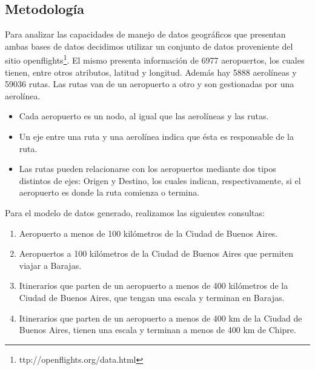 \documentclass{llncs}
\begin{document}
\subsection{Metodología}
Para analizar las capacidades de manejo de datos geográficos que presentan ambas bases de datos decidimos utilizar un conjunto de datos proveniente del sitio openflights\footnote{ttp://openflights.org/data.html}. El mismo presenta información de 6977 aeropuertos, los cuales tienen, entre otros atributos, latitud y longitud. Además hay 5888 aerolíneas y 59036 rutas. Las rutas van de un aeropuerto a otro y son gestionadas por una aerolínea.

\begin{itemize}
\item Cada aeropuerto es un nodo, al igual que las aerolíneas y las rutas.
\item Un eje entre una ruta y una aerolínea indica que ésta es responsable de la ruta.
\item Las rutas pueden relacionarse con los aeropuertos mediante dos tipos distintos de ejes: Origen y Destino, los cuales indican, respectivamente, si el aeropuerto es donde la ruta comienza o termina.
\end{itemize}

Para el modelo de datos generado, realizamos las siguientes consultas:
\begin{enumerate}
\item Aeropuerto a menos de 100 kilómetros de la Ciudad de Buenos Aires.
\item Aeropuertos a 100 kilómetros de la Ciudad de Buenos Aires que permiten viajar a Barajas.
\item Itinerarios que parten de un aeropuerto a menos de 400 kilómetros de la Ciudad de Buenos Aires, que tengan una escala y terminan en Barajas.
\item Itinerarios que parten de un aeropuerto a menos de 400 km de la Ciudad de Buenos Aires, tienen una escala y terminan a menos de 400 km de Chipre.
\end{enumerate}
\end{document}
